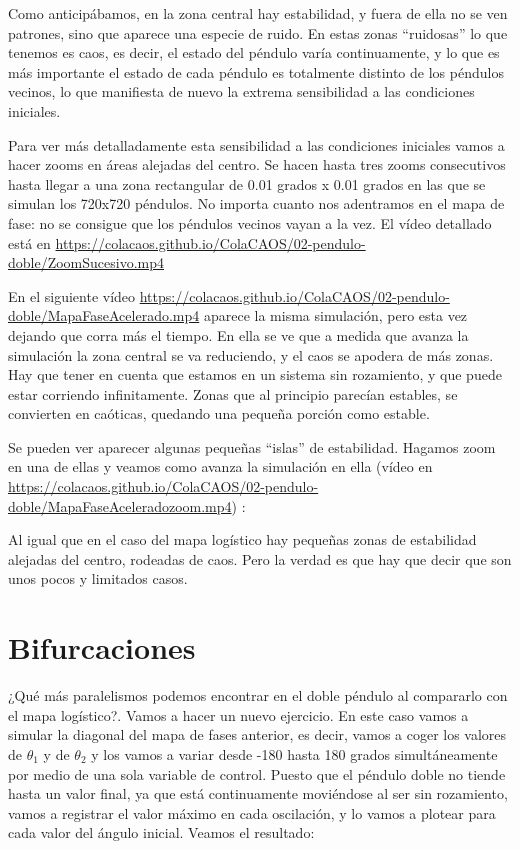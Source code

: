 \documentclass[
  10pt,
  a4paper,
  DIV=11,
  numbers=noendperiod,
  open=any]{scrreprt}
\numberwithin{equation}{chapter}
\numberwithin{equation}{section}
\renewcommand{\[}{\begin{equation}}
\renewcommand{\]}{\end{equation}}
\begin{document}
Como anticipábamos, en la zona central hay estabilidad, y fuera de ella
no se ven patrones, sino que aparece una especie de ruido. En estas
zonas ``ruidosas'' lo que tenemos es caos, es decir, el estado del
péndulo varía continuamente, y lo que es más importante el estado de
cada péndulo es totalmente distinto de los péndulos vecinos, lo que
manifiesta de nuevo la extrema sensibilidad a las condiciones iniciales.

Para ver más detalladamente esta sensibilidad a las condiciones
iniciales vamos a hacer zooms en áreas alejadas del centro. Se hacen
hasta tres zooms consecutivos hasta llegar a una zona rectangular de
0.01 grados x 0.01 grados en las que se simulan los 720x720 péndulos. No
importa cuanto nos adentramos en el mapa de fase: no se consigue que los
péndulos vecinos vayan a la vez. El vídeo detallado está en \url{https://colacaos.github.io/ColaCAOS/02-pendulo-doble/ZoomSucesivo.mp4}

En el siguiente vídeo \url{https://colacaos.github.io/ColaCAOS/02-pendulo-doble/MapaFaseAcelerado.mp4} aparece la misma simulación, pero esta vez dejando
que corra más el tiempo. En ella se ve que a medida que avanza la
simulación la zona central se va reduciendo, y el caos se apodera de más
zonas. Hay que tener en cuenta que estamos en un sistema sin rozamiento,
y que puede estar corriendo infinitamente. Zonas que al principio
parecían estables, se convierten en caóticas, quedando una pequeña
porción como estable.

Se pueden ver aparecer algunas pequeñas ``islas'' de estabilidad.
Hagamos zoom en una de ellas y veamos como avanza la simulación en ella (vídeo en \url{https://colacaos.github.io/ColaCAOS/02-pendulo-doble/MapaFaseAceleradozoom.mp4}) :

Al igual que en el caso del mapa logístico hay pequeñas zonas de
estabilidad alejadas del centro, rodeadas de caos. Pero la verdad es que
hay que decir que son unos pocos y limitados casos.

\chapter{Bifurcaciones}\label{bifurcaciones}

¿Qué más paralelismos podemos encontrar en el doble péndulo al
compararlo con el mapa logístico?. Vamos a hacer un nuevo ejercicio. En
este caso vamos a simular la diagonal del mapa de fases anterior, es
decir, vamos a coger los valores de \(\theta_1\) y de \(\theta_2\) y
los vamos a variar desde -180 hasta 180 grados simultáneamente por medio
de una sola variable de control. Puesto que el péndulo doble no tiende
hasta un valor final, ya que está continuamente moviéndose al ser sin
rozamiento, vamos a registrar el valor máximo en cada oscilación, y lo
vamos a plotear para cada valor del ángulo inicial. Veamos el resultado:
\end{document}
